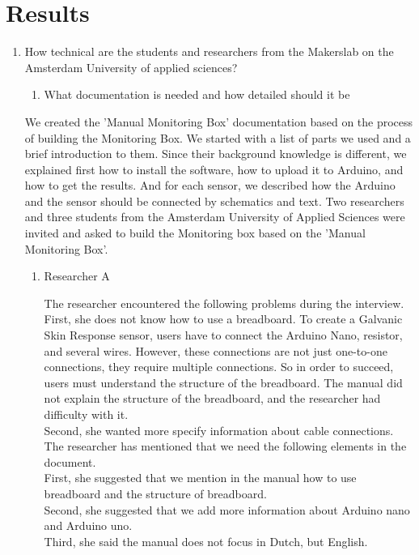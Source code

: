 \documentclass[conference]{IEEEtran}
\begin{document}
\section{Results}
\begin{enumerate}
\item How technical are the students and researchers from the Makerslab on the Amsterdam University of applied sciences?
\begin{enumerate}
\item What documentation is needed and how detailed should it be
\end{enumerate}

 We created the 'Manual Monitoring Box' documentation based on the process of building the Monitoring Box. We started with a list of parts we used and a brief introduction to them. Since their background knowledge is different, we explained first how to install the software, how to upload it to Arduino, and how to get the results. And for each sensor, we described how the Arduino and the sensor should be connected by schematics and text. Two researchers and three students from the Amsterdam University of Applied Sciences were invited and asked to build the Monitoring box based on the 'Manual Monitoring Box'. \\
\begin{enumerate}
\item Researcher A

The researcher encountered the following problems during the interview.\\

		First, she does not know how to use a breadboard. To create a Galvanic Skin Response sensor, users have to connect the Arduino Nano, resistor, and several wires. However, these connections are not just one-to-one connections, they require multiple connections. So in order to succeed, users must understand the structure of the breadboard. The manual did not explain the structure of the breadboard, and the researcher had difficulty with it.\\
		Second, she wanted more specify information about cable connections.\\
		 		
The researcher has mentioned that we need the following elements in the document.\\

		First, she suggested that we mention in the manual how to use breadboard and the structure of breadboard. \\
		Second, she suggested that we add more information about Arduino nano and Arduino uno.\\
		Third, she said the manual does not focus in Dutch, but English. \\
		

\end{enumerate}
\end{enumerate}
\end{document}
